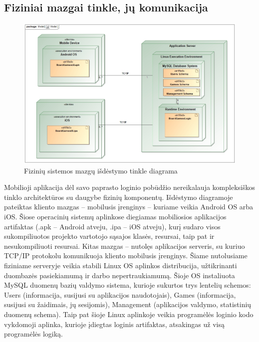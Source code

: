 \documentclass{VUMIFPSkursinis}
\begin{document}
	\subsection{Fiziniai mazgai tinkle, jų komunikacija}
				\begin{figure}[H]
				\centering
				\includegraphics[scale=0.5]{img/NodesCommunication}
				\caption{Fizinių sistemos mazgų išdėstymo tinkle diagrama}
				\label{img:NodesCommunication}
			\end{figure}
			Mobilioji aplikacija dėl savo paprasto loginio pobūdžio nereikalauja 				kompleksiškos tinklo architektūros su daugybe fizinių komponentų. 				Išdėstymo diagramoje pateiktas kliento mazgas – mobilusis įrenginys – 				kuriame veikia Android OS arba iOS. Šiose operacinių sistemų aplinkose 				diegiamas mobiliosios aplikacijos artifaktas (.apk – Android atveju, .ipa 				– iOS atveju), kurį sudaro visos sukompiliuotos projekto vartotojo sąsajos 				klasės, resursai, taip pat ir nesukompiliuoti resursai. Kitas mazgas – 				nutolęs aplikacijos serveris, su kuriuo TCP/IP protokolu komunikuoja kliento mobilusis įrenginys. Šiame nutolusiame fiziniame serveryje veikia stabili Linux OS 				aplinkos distribucija, užtikrinanti duombazės pasiekiamumą ir darbo 				nepertraukiamumą. Šioje OS instaliuota MySQL duomenų bazių valdymo 				sistema, kurioje sukurtos trys lentelių schemos: Users (informacija, 				susijusi su aplikacijos naudotojais), Games (informacija, susijusi su 				žaidimais, jų sesijomis), Management (aplikacijos valdymo, statistinių 				duomenų schema). Taip pat šioje Linux aplinkoje veikia programėlės loginio 				kodo vykdomoji aplinka, kurioje įdiegtas loginis artifaktas, atsakingas už 				visą programėlės logiką.
\end{document}
